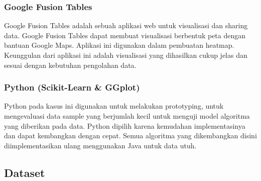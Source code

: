 \documentclass{article}
\begin{document}
\subsubsection{Google Fusion Tables}
\begin{adjustwidth}{4em}{0pt}
	
\hspace{\parindent}Google Fusion Tables adalah sebuah aplikasi web untuk visualisasi dan sharing data. Google Fusion Tables dapat membuat visualisasi berbentuk peta dengan bantuan Google Maps. Aplikasi ini digunakan dalam pembuatan heatmap. Keunggulan dari aplikasi ini adalah visualisasi yang dihasilkan cukup jelas dan sesuai dengan kebutuhan pengolahan data.

\end{adjustwidth}
\subsubsection{Python (Scikit-Learn \& GGplot)}
\begin{adjustwidth}{4em}{0pt}
		
\hspace{\parindent}Python pada kasus ini digunakan untuk melakukan prototyping, untuk mengevaluasi data sample yang berjumlah kecil untuk menguji model algoritma yang diberikan pada data. Python dipilih karena kemudahan implementasinya dan dapat kembangkan dengan cepat. Semua algoritma yang dikembangkan disini diimplementasikan ulang menggunakan Java untuk data utuh.

\end{adjustwidth}

\subsection{Dataset}
\end{document}
